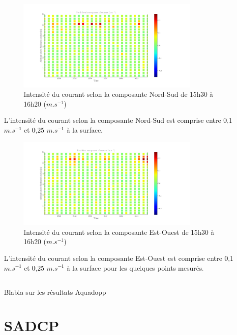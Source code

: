 \documentclass[12pt]{article}
\begin{document}
\begin{figure}[!h]
	\begin{center}
		\includegraphics[width=0.8\textwidth]{18032102scatterv2.png}
		\caption{Intensité du courant selon la composante Nord-Sud de 15h30 à 16h20 ($m.s^{-1}$)}
	\end{center}
\end{figure}
L'intensité du courant selon la composante Nord-Sud est comprise entre 0,1 $m.s^{-1}$ et 0,25 $m.s^{-1}$ à la surface.\\

\begin{figure}[!h]
	\begin{center}
		\includegraphics[width=0.8\textwidth]{18032102scatterv1.png}
		\caption{Intensité du courant selon la composante Est-Ouest de 15h30 à 16h20 ($m.s^{-1}$)}
	\end{center}
\end{figure}
L'intensité du courant selon la composante Est-Ouest est comprise entre 0,1 $m.s^{-1}$ et 0,25 $m.s^{-1}$ à la surface pour les quelques points mesurés.\\

\subsection{}
Blabla sur les résultats Aquadopp

\section{SADCP}
\end{document}
